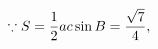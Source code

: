 \documentclass[preview]{standalone}
\begin{document}
\begin{align*}
\special{dvisvgm:raw <g id='unique000'>}\because S=\frac{1}{2}ac\sin B=\frac{\sqrt{7}}{4},\special{dvisvgm:raw </g>}
\end{align*}
\end{document}
